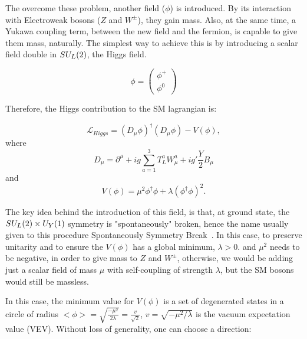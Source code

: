 The overcome these problem, another field ($\phi$) is introduced. By its interaction with Electroweak bosons ($Z$ and $W^\pm$), they gain mass. Also, at the same time, a Yukawa coupling term, between the new field and the fermion, is capable to give them mass, naturally. The simplest way to achieve this is by introducing a scalar field double in $SU_{\scaleto{L}{5pt}}(2)$, the Higgs field.

\begin{equation}
    \phi = 
        \left ( 
        \begin{matrix}
        \phi^+ \\
        \phi^0 
        \end{matrix}
        \right )
    \label{higgs_field}
\end{equation}

Therefore, the Higgs contribution to the SM lagrangian is:

\begin{equation}
    \mathcal{L}_{Higgs} = (D_\mu\phi)^\dagger(D_\mu\phi) - V(\phi),
    \label{higgs_field1}
\end{equation}
where
\begin{equation}
    D_\mu = \partial^\mu + ig \sum^3_{a=1} T_L^a W_\mu^a + ig'\frac{Y}{2}B_\mu
    \label{higgs_field2}
\end{equation}
and 
\begin{equation}
    V(\phi) = \mu^2 \phi^\dagger \phi + \lambda(\phi^\dagger \phi)^2.
    \label{higgs_field3}
\end{equation}

The key idea behind the introduction of this field, is that, at ground state, the $SU_{\scaleto{L}{5pt}}(2) \times U_{\scaleto{Y}{5pt}}(1)$ symmetry is "spontaneously" broken, hence the name usually given to this procedure Spontaneously Symmetry Break~\cite{Higgs:1964pj, Higgs:1964ia, Higgs:1966ev, Englert:1964et, Guralnik:1964eu, Kibble:1967sv}. In this case, to preserve unitarity and to ensure the $V(\phi)$ has a global minimum, $\lambda > 0$.  and $\mu^2$ needs to be negative, in order to give mass to $Z$ and $W^\pm$, otherwise, we would be adding just a scalar field of mass $\mu$ with self-coupling of strength $\lambda$, but the SM bosons would still be massless.


In this case, the minimum value for $V(\phi)$ is a set of degenerated states in a circle of radius $<\phi> = \sqrt{\frac{-\mu^2}{2\lambda}} = \frac{v}{\sqrt{2}}$, $v = \sqrt{-\mu^2/\lambda}$ is the vacuum expectation value (VEV). Without loss of generality, one can choose a direction:

